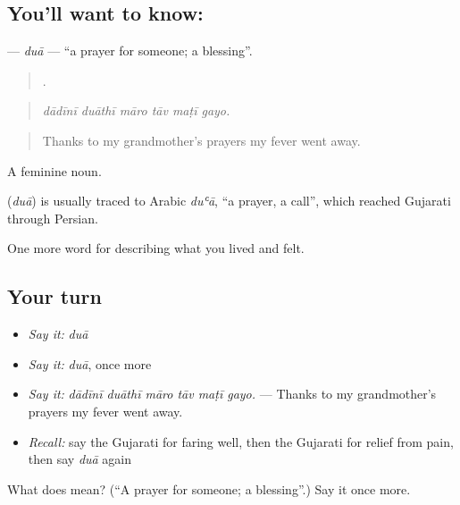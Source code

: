 \subsection*{You'll want to know: }
\textbf{} — \emph{duā} — \textquotedblleft{}a prayer for someone; a blessing\textquotedblright{}.

\begin{quote}
     .
\end{quote}

\begin{quote}
\emph{dādīnī duāthī māro tāv maṭī gayo.}
\end{quote}

\begin{quote}
Thanks to my grandmother's prayers my fever went away.
\end{quote}

A feminine noun.

\begin{cousinweb}
\textbf{} (\emph{duā}) is usually traced to Arabic \emph{duʿā}, \textquotedblleft{}a prayer, a call\textquotedblright{}, which reached Gujarati through Persian.
\end{cousinweb}

\begin{grammarlens}[title={What you've built}]
One more word for describing what you lived and felt.
\end{grammarlens}

\subsection*{Your turn}
\begin{itemize}
\raggedright
  \item \emph{Say it:} \emph{duā}
  \item \emph{Say it:} \emph{duā}, once more
  \item \emph{Say it:} \emph{dādīnī duāthī māro tāv maṭī gayo.} — Thanks to my grandmother's prayers my fever went away.
  \item \emph{Recall:} say the Gujarati for faring well, then the Gujarati for relief from pain, then say \emph{duā} again
\end{itemize}

\begin{tcolorbox}[breakable,colback=teal!4,colframe=teal!35!black,title={Before you move on}]
What does  mean? (\textquotedblleft{}A prayer for someone; a blessing\textquotedblright{}.) Say it once more.
\end{tcolorbox}
